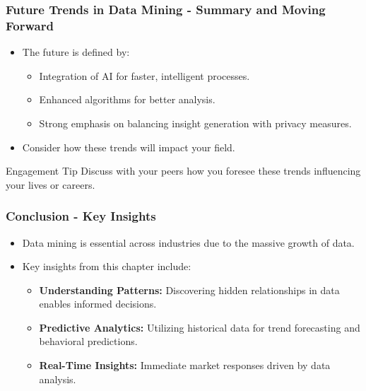 \documentclass[aspectratio=169]{beamer}
\begin{document}
\begin{frame}[fragile]
    \frametitle{Future Trends in Data Mining - Summary and Moving Forward}
    \begin{itemize}
        \item The future is defined by:
        \begin{itemize}
            \item Integration of AI for faster, intelligent processes.
            \item Enhanced algorithms for better analysis.
            \item Strong emphasis on balancing insight generation with privacy measures.
        \end{itemize}
        \item Consider how these trends will impact your field.
    \end{itemize}
    \begin{block}{Engagement Tip}
        Discuss with your peers how you foresee these trends influencing your lives or careers. 
    \end{block}
\end{frame}

\begin{frame}[fragile]
    \frametitle{Conclusion - Key Insights}
    \begin{itemize}
        \item Data mining is essential across industries due to the massive growth of data.
        \item Key insights from this chapter include:
            \begin{itemize}
                \item \textbf{Understanding Patterns:} Discovering hidden relationships in data enables informed decisions.
                \item \textbf{Predictive Analytics:} Utilizing historical data for trend forecasting and behavioral predictions.
                \item \textbf{Real-Time Insights:} Immediate market responses driven by data analysis.
            \end{itemize}
    \end{itemize}
\end{frame}
\end{document}
